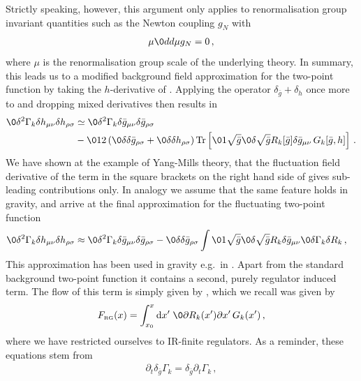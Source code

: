 \documentclass[11pt]{book} %
\newcommand{\Tr}{\mathrm{Tr}}
\begin{document}
{Strictly speaking, however, this
argument only applies to renormalisation group invariant quantities
such as the Newton coupling $g_N$ with
\begin{align}
	\mu\0{d}{d\mu} g_N=0\,,
\end{align}
where $\mu$ is the renormalisation group scale of the underlying
theory. In summary, this leads us to a modified background field
approximation for the two-point function by taking the $h$-derivative
of .
Applying the operator $\delta_{\bar g} + \delta_h$ once more to
 and dropping mixed derivatives then results in
\begin{align}
	\0{\delta^2 \Gamma_k}{\delta h_{\mu\nu}\delta h_{\rho\sigma}}&\simeq 
	\0{\delta^2 \Gamma_k}{\delta \bar g_{\mu\nu}\delta \bar g_{\rho\sigma}}  \notag \\
	&-\012 \left(\0{\delta}{\delta\bar g_{\rho\sigma}}+\0{\delta}{\delta h_{\rho\sigma}}
		\right) \Tr\left[ \0{1}{\sqrt{\bar g}}\0{\delta \sqrt{\bar g} R_k[\bar g]}{\delta \bar g_{\mu\nu}}\, G_k[\bar
	g, h]\right]\,.
\label{eq:gravpropNIk}
\end{align}
We have shown at the example of Yang-Mills theory, that the
fluctuation field derivative of the term in the square brackets on the
right hand side of  gives sub-leading
contributions only.
In analogy we assume that the same feature holds in
gravity, and arrive at the final approximation for the fluctuating
two-point function
\begin{align} \label{eq:modback}
	\0{\delta^2 \Gamma_k}{\delta h_{\mu\nu}\delta h_{\rho\sigma}}&\approx \0{\delta^2 \Gamma_k}{\delta \bar g_{\mu\nu}\delta \bar g_{\rho\sigma}}  
	- \0{\delta}{\delta \bar g_{\rho\sigma}} \int \0{1}{\sqrt{\bar g}}\0{\delta \sqrt{\bar g} R_k}{\delta \bar g_{\mu\nu}}\0{\delta
	\Gamma_k}{\delta R_k}\,,
\end{align}
This approximation has been used in gravity e.g.\ in
\cite{Donkin,Donkin:2012ud}. Apart from the standard background
two-point function it contains a second, purely regulator induced term.
The flow of this term is simply given by
, which we recall was given by
\begin{align}\label{eq:Fg}
	F_{\text{\tiny RG}}(x)= \int_{x_0}^x \mathrm dx' \; \0{\partial R_k(x')}{\partial x'} \, G_k(x')\,,
\end{align}
where we have restricted ourselves to IR-finite regulators.
As a reminder, these equations stem from
\begin{align}
 \partial_t \delta_{\bar g} \Gamma_k = \delta_{\bar g} \partial_t \Gamma_k \,,

\end{align}}
\end{document}
